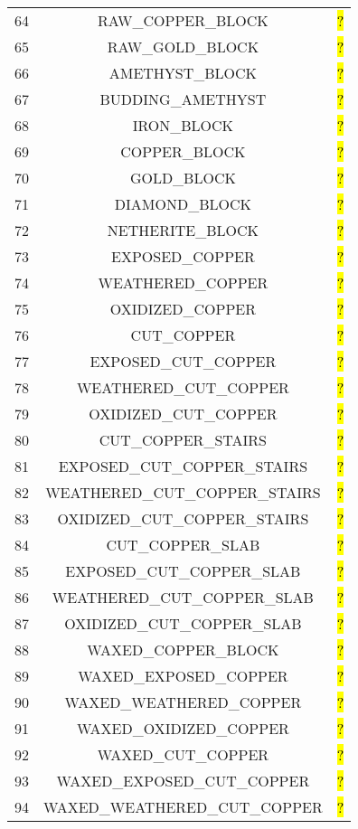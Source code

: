 \documentclass[11pt]{article}
\newcommand\myworries[1]{\sethlcolor{red}\hl{#1}}
\begin{document}
\begin{longtable}{ |c|c|c| }
64 & RAW\_COPPER\_BLOCK & \myworries{?} \\
65 & RAW\_GOLD\_BLOCK & \myworries{?} \\
66 & AMETHYST\_BLOCK & \myworries{?} \\
67 & BUDDING\_AMETHYST & \myworries{?} \\
68 & IRON\_BLOCK & \myworries{?} \\
69 & COPPER\_BLOCK & \myworries{?} \\
70 & GOLD\_BLOCK & \myworries{?} \\
71 & DIAMOND\_BLOCK & \myworries{?} \\
72 & NETHERITE\_BLOCK & \myworries{?} \\
73 & EXPOSED\_COPPER & \myworries{?} \\
74 & WEATHERED\_COPPER & \myworries{?} \\
75 & OXIDIZED\_COPPER & \myworries{?} \\
76 & CUT\_COPPER & \myworries{?} \\
77 & EXPOSED\_CUT\_COPPER & \myworries{?} \\
78 & WEATHERED\_CUT\_COPPER & \myworries{?} \\
79 & OXIDIZED\_CUT\_COPPER & \myworries{?} \\
80 & CUT\_COPPER\_STAIRS & \myworries{?} \\
81 & EXPOSED\_CUT\_COPPER\_STAIRS & \myworries{?} \\
82 & WEATHERED\_CUT\_COPPER\_STAIRS & \myworries{?} \\
83 & OXIDIZED\_CUT\_COPPER\_STAIRS & \myworries{?} \\
84 & CUT\_COPPER\_SLAB & \myworries{?} \\
85 & EXPOSED\_CUT\_COPPER\_SLAB & \myworries{?} \\
86 & WEATHERED\_CUT\_COPPER\_SLAB & \myworries{?} \\
87 & OXIDIZED\_CUT\_COPPER\_SLAB & \myworries{?} \\
88 & WAXED\_COPPER\_BLOCK & \myworries{?} \\
89 & WAXED\_EXPOSED\_COPPER & \myworries{?} \\
90 & WAXED\_WEATHERED\_COPPER & \myworries{?} \\
91 & WAXED\_OXIDIZED\_COPPER & \myworries{?} \\
92 & WAXED\_CUT\_COPPER & \myworries{?} \\
93 & WAXED\_EXPOSED\_CUT\_COPPER & \myworries{?} \\
94 & WAXED\_WEATHERED\_CUT\_COPPER & \myworries{?} \\

\end{longtable}
\end{document}
